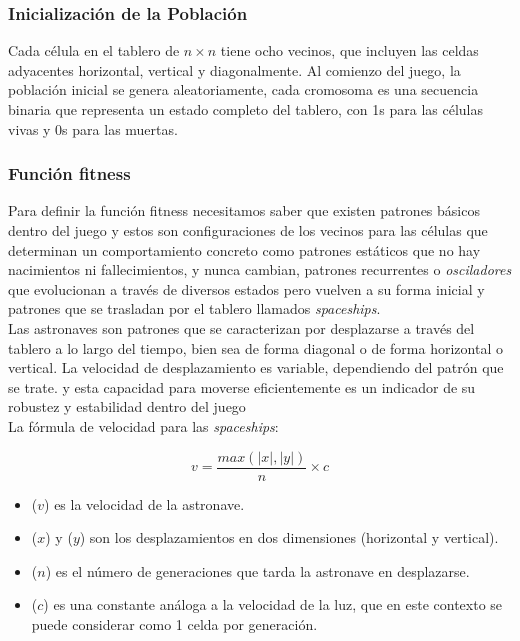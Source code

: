 \subsubsection*{Inicialización de la Población}

Cada célula en el tablero de $n \times n$ tiene ocho vecinos, que incluyen las celdas 
adyacentes horizontal, vertical y diagonalmente. Al comienzo del juego, la población inicial 
se genera aleatoriamente, cada cromosoma es una secuencia binaria que representa un estado 
completo del tablero, con 1s para las células vivas y 0s para las muertas.

\subsubsection*{Función fitness}

Para definir la función fitness necesitamos saber que existen patrones básicos dentro del 
juego y estos son configuraciones de los vecinos para las células que determinan un 
comportamiento concreto como patrones estáticos que no hay nacimientos ni fallecimientos,
y nunca cambian, patrones recurrentes o \textit{osciladores} que evolucionan a través de 
diversos estados pero vuelven a su forma inicial y patrones que se trasladan por el tablero
llamados \textit{spaceships}.\\ 

Las astronaves \cite{spaceships} son patrones que se caracterizan por desplazarse a través 
del tablero a lo largo del tiempo, bien sea de forma diagonal o de forma horizontal o 
vertical. La velocidad de desplazamiento es variable, dependiendo del patrón que se trate.
y esta capacidad para moverse eficientemente es un indicador de su robustez y estabilidad 
dentro del juego\\ 

\noindent La fórmula de velocidad para las \textit{spaceships}:

\begin{equation*}
    v = \frac{max(|x|,|y|)}{n} \times c
\end{equation*}

\begin{itemize}
    \item[] ($v$) es la velocidad de la astronave.
    \item[] ($x$) y ($y$) son los desplazamientos en dos dimensiones (horizontal y vertical).
    \item[] ($n$) es el número de generaciones que tarda la astronave en desplazarse.
    \item[] ($c$) es una constante análoga a la velocidad de la luz, que en este contexto se 
    puede considerar como 1 celda por generación.
\end{itemize}

